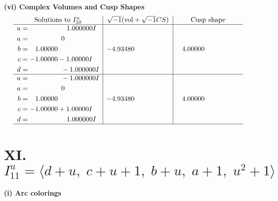 \documentclass[1p]{elsarticle_modified}
\theoremstyle{definition}
\newcommand{\I}{\sqrt{-1}}
\begin{document}
\newpage\flushleft \textbf{(vi) Complex Volumes and Cusp Shapes}
$$\begin{array}{c|c|c}  
\text{Solutions to }I^u_{10}& \I (\text{vol} + \sqrt{-1}CS) & \text{Cusp shape}\\
 \hline 
\begin{aligned}
u &= \phantom{-0.000000 -}1.000000 I \\
a &= \phantom{-0.000000 } 0 \\
b &= \phantom{-}1.00000\phantom{ +0.000000I} \\
c &= -1.00000 - 1.00000 I \\
d &= \phantom{-0.000000 } -1.000000 I\end{aligned}
 & -4.93480\phantom{ +0.000000I} & \phantom{-}4.00000\phantom{ +0.000000I} \\ \hline\begin{aligned}
u &= \phantom{-0.000000 } -1.000000 I \\
a &= \phantom{-0.000000 } 0 \\
b &= \phantom{-}1.00000\phantom{ +0.000000I} \\
c &= -1.00000 + 1.00000 I \\
d &= \phantom{-0.000000 -}1.000000 I\end{aligned}
 & -4.93480\phantom{ +0.000000I} & \phantom{-}4.00000\phantom{ +0.000000I}\\
 \hline 
 \end{array}$$\newpage\newpage\renewcommand{\arraystretch}{1}
\centering \section*{XI. $I^u_{11}= \langle d+u,\;c+u+1,\;b+u,\;a+1,\;u^2+1 \rangle$}
\flushleft \textbf{(i) Arc colorings}\\
\end{document}
